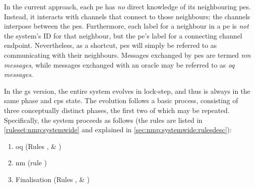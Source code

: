 In the current approach, each \gls{pe} has \emph{no} direct knowledge of its neighbouring \glspl{pe}.  Instead, it interacts with channels that connect to those neighbours; the channels interpose between the \glspl{pe}.  Furthermore, each label for a neighbour in a \gls{pe} is \emph{not} the system's ID for that neighbour, but the \gls{pe}'s label for a connecting channel endpoint.  Nevertheless, as a shortcut, \glspl{pe} will simply be referred to as communicating with their neighbours.  Messages exchanged by \glspl{pe} are termed \emph{\gls{nm} messages}, while messages exchanged with an oracle may be referred to as \emph{\gls{oq} messages}.

In the \gls{gs} version, the entire system evolves in lock-step, and thus is always in the same phase and \gls{cps} state.  The evolution follows a basic process, consisting of three conceptually distinct phases, the first two of which may be repeated.  Specifically, the system proceeds as follows (the rules are listed in \vref{ruleset:nmp:systemwide} and explained in \vref{sec:nmp:systemwide:rulesdesc}):

\begin{enumerate}
    \item\label{enumitem:nmp:pu} \Gls{oq} (Rules ,  \& )
    \item\label{enumitem:nmp:nm} \Gls{nm} (rule )
    \item\label{enumitem:nmp:final} Finalisation (Rules ,  \& )
\end{enumerate}


